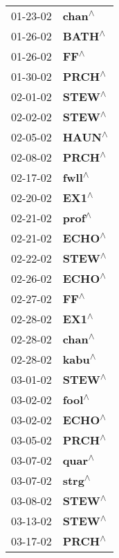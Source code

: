 \begin{supertabular}{p{0.08\textwidth}p{0.2\textwidth}}
 01-23-02 &    \textbf{chan\textsuperscript{$\wedge$}} \\
 01-26-02 &    \textbf{BATH\textsuperscript{$\wedge$}} \\
 01-26-02 &      \textbf{FF\textsuperscript{$\wedge$}} \\
 01-30-02 &    \textbf{PRCH\textsuperscript{$\wedge$}} \\
 02-01-02 &    \textbf{STEW\textsuperscript{$\wedge$}} \\
 02-02-02 &    \textbf{STEW\textsuperscript{$\wedge$}} \\
 02-05-02 &    \textbf{HAUN\textsuperscript{$\wedge$}} \\
 02-08-02 &    \textbf{PRCH\textsuperscript{$\wedge$}} \\
 02-17-02 &    \textbf{fwll\textsuperscript{$\wedge$}} \\
 02-20-02 &     \textbf{EX1\textsuperscript{$\wedge$}} \\
 02-21-02 &    \textbf{prof\textsuperscript{$\wedge$}} \\
 02-21-02 &    \textbf{ECHO\textsuperscript{$\wedge$}} \\
 02-22-02 &    \textbf{STEW\textsuperscript{$\wedge$}} \\
 02-26-02 &    \textbf{ECHO\textsuperscript{$\wedge$}} \\
 02-27-02 &      \textbf{FF\textsuperscript{$\wedge$}} \\
 02-28-02 &     \textbf{EX1\textsuperscript{$\wedge$}} \\
 02-28-02 &    \textbf{chan\textsuperscript{$\wedge$}} \\
 02-28-02 &    \textbf{kabu\textsuperscript{$\wedge$}} \\
 03-01-02 &    \textbf{STEW\textsuperscript{$\wedge$}} \\
 03-02-02 &    \textbf{fool\textsuperscript{$\wedge$}} \\
 03-02-02 &    \textbf{ECHO\textsuperscript{$\wedge$}} \\
 03-05-02 &    \textbf{PRCH\textsuperscript{$\wedge$}} \\
 03-07-02 &    \textbf{quar\textsuperscript{$\wedge$}} \\
 03-07-02 &    \textbf{strg\textsuperscript{$\wedge$}} \\
 03-08-02 &    \textbf{STEW\textsuperscript{$\wedge$}} \\
 03-13-02 &    \textbf{STEW\textsuperscript{$\wedge$}} \\
 03-17-02 &    \textbf{PRCH\textsuperscript{$\wedge$}} \\

\end{supertabular}
